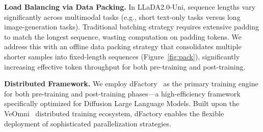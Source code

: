 \noindent
\textbf{Load Balancing via Data Packing.}
In LLaDA2.0-Uni, sequence lengths vary significantly across multimodal tasks (e.g., short text-only tasks versus long image-generation tasks).
Traditional batching strategy requires extensive padding to match the longest sequence, wasting computation on padding tokens.
We address this with an offline data packing strategy that consolidates multiple shorter samples into fixed-length sequences (Figure~\ref{fig:pack}), significantly increasing effective token throughput for both pre-training and post-training.


\noindent
\textbf{Distributed Framework.}
We employ dFactory~\citep{dFactory} as the primary training engine for both pre-training and post-training phases---a high-efficiency framework specifically optimized for Diffusion Large Language Models. 
Built upon the VeOmni~\citep{ma2025veomni} distributed training ecosystem, dFactory enables the flexible deployment of sophisticated parallelization strategies. 